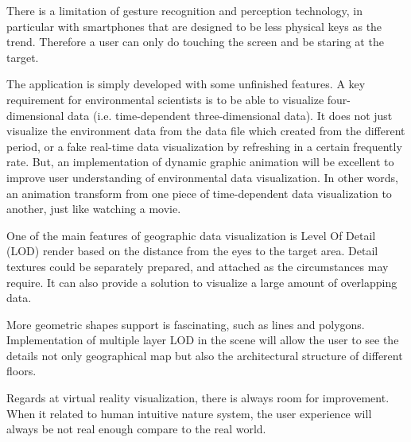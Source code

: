 
There is a limitation of gesture recognition and perception technology, in particular with smartphones that are designed to be less physical keys as the trend. Therefore a user can only do touching the screen and be staring at the target.

The application is simply developed with some unfinished features. A key requirement for environmental scientists is to be able to visualize four-dimensional data (i.e. time-dependent three-dimensional data). It does not just visualize the environment data from the data file which created from the different period, or a fake real-time data visualization by refreshing in a certain frequently rate. But, an implementation of dynamic graphic animation will be excellent to improve user understanding of environmental data visualization. In other words, an animation transform from one piece of time-dependent data visualization to another, just like watching a movie.

One of the main features of geographic data visualization is Level Of Detail (LOD) render based on the distance from the eyes to the target area. Detail textures could be separately prepared, and attached as the circumstances may require. It can also provide a solution to visualize a large amount of overlapping data.

More geometric shapes support is fascinating, such as lines and polygons. Implementation of multiple layer LOD in the scene will allow the user to see the details not only geographical map but also the architectural structure of different floors.

Regards at virtual reality visualization, there is always room for improvement. When it related to human intuitive nature system, the user experience will always be not real enough compare to the real world.

